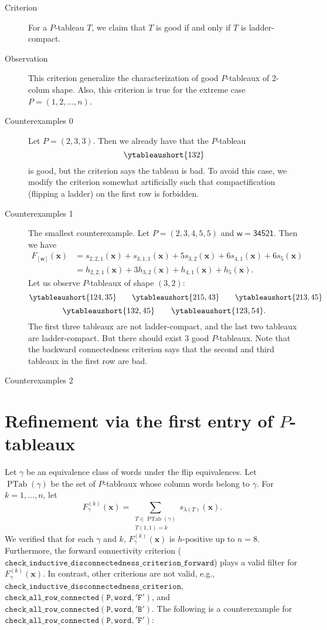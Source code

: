 \documentclass[11pt,reqno]{amsart}
\theoremstyle{definition}
\theoremstyle{remark}
\numberwithin{equation}{section}
\newcommand\xx{\mathbf{x}}
\newcommand\ww{\mathsf{w}}
\newcommand\PTab{\operatorname{PTab}}
\begin{document}
\begin{description}
  \item[Criterion] For a \( P \)-tableau \( T \), we claim that \( T \) is good if and only if
  \( T \) is ladder-compact.
  \item[Observation] This criterion generalize the characterization of good \( P \)-tableaux of
  2-colum shape. Also, this criterion is true for the extreme case \( P=(1,2,\dots,n) \).
  \item[Counterexamples 0] Let \( P=(2,3,3) \). Then we already have that the \( P \)-tableau
  \[
    \ytableaushort{132}
  \]
  is good, but the criterion says the tableau is bad. To avoid this case, we modify the criterion
  somewhat artificially such that compactification (flipping a ladder) on the first row is forbidden.
  \item[Counterexamples 1] The smallest counterexample. Let \( P=(2,3,4,5,5) \) and
  \( \ww=\mathsf{34521} \). Then we have
  \begin{align*}
    F_{[\ww]}(\xx)
      &= s_{2,2,1}(\xx) + s_{3,1,1}(\xx) + 5 s_{3,2}(\xx) + 6 s_{4,1}(\xx) + 6 s_5(\xx) \\
      &= h_{2,2,1}(\xx) + 3 h_{3,2}(\xx) + h_{4,1}(\xx) + h_5(\xx).
  \end{align*}
  Let us observe \( P \)-tableaux of shape \( (3,2) \):
  \[
    \ytableaushort{124,35} \qquad \ytableaushort{215,43} \qquad \ytableaushort{213,45}
  \]
  \[
    \ytableaushort{132,45} \qquad \ytableaushort{123,54}.
  \]
  The first three tableaux are not ladder-compact, and the last two tableaux are ladder-compact.
  But there should exist 3 good \( P \)-tableaux.
  Note that the backward connectedness criterion says that the second and third tableaux in the
  first row are bad.
  \item[Counterexamples 2] 
\end{description}


\section{Refinement via the first entry of \( P \)-tableaux}
Let \( \gamma \) be an equivalence class of words under the flip equivalences.
Let \( \PTab(\gamma) \) be the set of \( P \)-tableaux whose column words belong to \( \gamma \).
For \( k=1,\dots, n \), let
\[
  F_{\gamma}^{(k)}(\xx) = \sum_{\substack{T\in\PTab(\gamma) \\ T(1,1)=k}} s_{\lambda(T)}(\xx).
\]
We verified that for each \( \gamma \) and \( k \), \( F_\gamma^{(k)}(\xx) \) is \( h \)-positive
up to \( n=8 \).
Furthermore, the forward connectivity criterion
(\( \mathtt{check\_inductive\_disconnectedness\_criterion\_forward} \)) plays a valid filter
for \( F_\gamma^{(k)}(\xx) \).
In contrast, other criterions are not valid, e.g.,
\( \mathtt{check\_inductive\_disconnectedness\_criterion} \),
\( \mathtt{check\_all\_row\_connected(P, word, 'F')} \), and
\( \mathtt{check\_all\_row\_connected(P, word, 'B')} \).
The following is a counterexample for \( \mathtt{check\_all\_row\_connected(P, word, 'F')} \):
\end{document}
